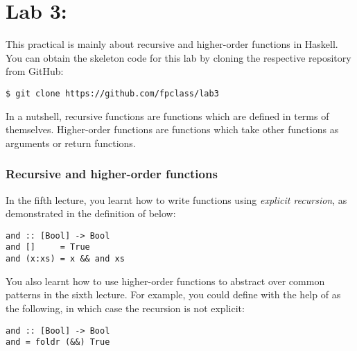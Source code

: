 \section{Lab 3: \practicalThreeTitle}

This practical is mainly about recursive and higher-order functions in Haskell. You can obtain the skeleton code for this lab by cloning the respective repository from GitHub:
\begin{verbatim}
$ git clone https://github.com/fpclass/lab3
\end{verbatim}
In a nutshell, recursive functions are functions which are defined in terms of themselves. Higher-order functions are functions which take other functions as arguments or return functions.

\taskLine


\taskLine

\subsubsection{Recursive and higher-order functions}

In the fifth lecture, you learnt how to write functions using \emph{explicit recursion}, as demonstrated in the definition of  below:
\begin{verbatim}
and :: [Bool] -> Bool
and []     = True 
and (x:xs) = x && and xs
\end{verbatim}
You also learnt how to use higher-order functions to abstract over common patterns in the sixth lecture. For example, you could define  with the help of  as the following, in which case the recursion is not explicit:
\begin{verbatim}
and :: [Bool] -> Bool 
and = foldr (&&) True
\end{verbatim} 

